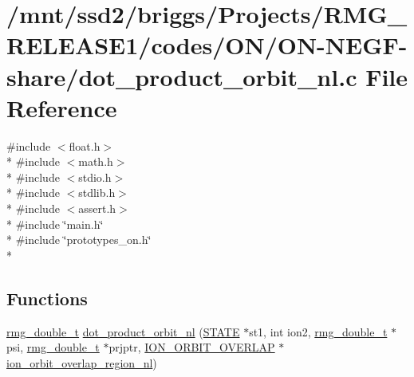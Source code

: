\hypertarget{_o_n_2_o_n-_n_e_g_f-share_2dot__product__orbit__nl_8c}{\section{/mnt/ssd2/briggs/\-Projects/\-R\-M\-G\-\_\-\-R\-E\-L\-E\-A\-S\-E1/codes/\-O\-N/\-O\-N-\/\-N\-E\-G\-F-\/share/dot\-\_\-product\-\_\-orbit\-\_\-nl.c File Reference}
\label{_o_n_2_o_n-_n_e_g_f-share_2dot__product__orbit__nl_8c}
}
{\ttfamily \#include $<$float.\-h$>$}\\*
{\ttfamily \#include $<$math.\-h$>$}\\*
{\ttfamily \#include $<$stdio.\-h$>$}\\*
{\ttfamily \#include $<$stdlib.\-h$>$}\\*
{\ttfamily \#include $<$assert.\-h$>$}\\*
{\ttfamily \#include \char`\"{}main.\-h\char`\"{}}\\*
{\ttfamily \#include \char`\"{}prototypes\-\_\-on.\-h\char`\"{}}\\*
\subsection*{Functions}
\begin{DoxyCompactItemize}
\item 
\hyperlink{rmgtypes_8h_aaa16921c14f121c56eaa42390a340db8}{rmg\-\_\-double\-\_\-t} \hyperlink{_o_n_2_o_n-_n_e_g_f-share_2dot__product__orbit__nl_8c_a8ca2b5424c89df97e09d76068eac2b83}{dot\-\_\-product\-\_\-orbit\-\_\-nl} (\hyperlink{struct_s_t_a_t_e}{S\-T\-A\-T\-E} $\ast$st1, int ion2, \hyperlink{rmgtypes_8h_aaa16921c14f121c56eaa42390a340db8}{rmg\-\_\-double\-\_\-t} $\ast$psi, \hyperlink{rmgtypes_8h_aaa16921c14f121c56eaa42390a340db8}{rmg\-\_\-double\-\_\-t} $\ast$prjptr, \hyperlink{struct_i_o_n___o_r_b_i_t___o_v_e_r_l_a_p}{I\-O\-N\-\_\-\-O\-R\-B\-I\-T\-\_\-\-O\-V\-E\-R\-L\-A\-P} $\ast$\hyperlink{overlap_8h_a3f6f41aad9960000a7629ce965eba61d}{ion\-\_\-orbit\-\_\-overlap\-\_\-region\-\_\-nl})
\end{DoxyCompactItemize}


